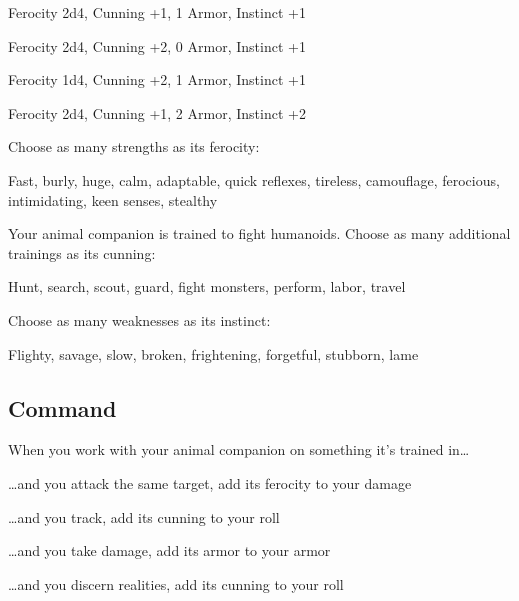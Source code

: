            
\startitemize[1,packed]
             
\item Ferocity 2d4, Cunning +1, 1 Armor, Instinct +1

             
\item Ferocity 2d4, Cunning +2, 0 Armor, Instinct +1

             
\item Ferocity 1d4, Cunning +2, 1 Armor, Instinct +1

             
\item Ferocity 2d4, Cunning +1, 2 Armor, Instinct +2

           
\stopitemize
           

Choose as many strengths as its ferocity:

           
\startExample
Fast, burly, huge, calm, adaptable, quick reflexes, tireless, camouflage, ferocious, intimidating, keen senses, stealthy
\stopExample
           

Your animal companion is trained to fight humanoids. Choose as many additional trainings as its cunning:

           
\startExample
Hunt, search, scout, guard, fight monsters, perform, labor, travel
\stopExample
           

Choose as many weaknesses as its instinct:

           
\startExample
Flighty, savage, slow, broken, frightening, forgetful, stubborn, lame
\stopExample
           
\subsection{Command}   
           

When you work with your animal companion on something it's trained in…

           
\startitemize[1,packed]
             
\item …and you attack the same target, add its ferocity to your damage

             
\item …and you track, add its cunning to your roll

             
\item …and you take damage, add its armor to your armor

             
\item …and you discern realities, add its cunning to your roll

